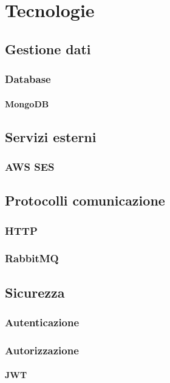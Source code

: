 \chapter{Tecnologie}



\section{Gestione dati}
\subsection{Database}
\subsubsection{MongoDB}

\section{Servizi esterni}
\subsection{AWS SES}

\section{Protocolli comunicazione}
\subsection{HTTP}
\subsection{RabbitMQ}


\section{Sicurezza}
\subsection{Autenticazione}

\subsection{Autorizzazione}

\subsubsection{JWT}

